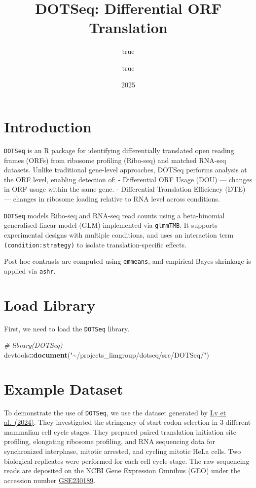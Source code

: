 \documentclass[
]{article}
\title{DOTSeq: Differential ORF Translation}
\author{true \and true}
\date{2025}
\newenvironment{Shaded}{\begin{snugshade}}{\end{snugshade}}
\newcommand{\CommentTok}[1]{\textcolor[rgb]{0.56,0.35,0.01}{\textit{#1}}}
\newcommand{\FunctionTok}[1]{\textcolor[rgb]{0.13,0.29,0.53}{\textbf{#1}}}
\newcommand{\NormalTok}[1]{#1}
\newcommand{\SpecialCharTok}[1]{\textcolor[rgb]{0.81,0.36,0.00}{\textbf{#1}}}
\newcommand{\StringTok}[1]{\textcolor[rgb]{0.31,0.60,0.02}{#1}}
\begin{document}
\maketitle

\section{Introduction}\label{introduction}

\texttt{DOTSeq} is an R package for identifying differentially
translated open reading frames (ORFs) from ribosome profiling (Ribo-seq)
and matched RNA-seq datasets. Unlike traditional gene-level approaches,
DOTSeq performs analysis at the ORF level, enabling detection of: -
Differential ORF Usage (DOU) --- changes in ORF usage within the same
gene. - Differential Translation Efficiency (DTE) --- changes in
ribosome loading relative to RNA level across conditions.

\texttt{DOTSeq} models Ribo-seq and RNA-seq read counts using a
beta-binomial generalised linear model (GLM) implemented via
\texttt{glmmTMB}. It supports experimental designs with multiple
conditions, and uses an interaction term \texttt{(condition:strategy)}
to isolate translation-specific effects.

Post hoc contrasts are computed using \texttt{emmeans}, and empirical
Bayes shrinkage is applied via \texttt{ashr}.

\section{Load Library}\label{load-library}

First, we need to load the \texttt{DOTSeq} library.

\begin{Shaded}
\begin{Highlighting}[]
\CommentTok{\# library(DOTSeq)}
\NormalTok{devtools}\SpecialCharTok{::}\FunctionTok{document}\NormalTok{(}\StringTok{"\textasciitilde{}/projects\_limgroup/dotseq/src/DOTSeq/"}\NormalTok{)}
\end{Highlighting}
\end{Shaded}

\section{Example Dataset}\label{example-dataset}

To demonstrate the use of \texttt{DOTSeq}, we use the dataset generated
by \href{https://doi.org/10.1038/s41586-024-08088-3}{Ly et al.~(2024)}.
They investigated the stringency of start codon selection in 3 different
mammalian cell cycle stages. They prepared paired translation initiation
site profiling, elongating ribosome profiling, and RNA sequencing data
for synchronized interphase, mitotic arrested, and cycling mitotic HeLa
cells. Two biological replicates were performed for each cell cycle
stage. The raw sequencing reads are deposited on the NCBI Gene
Expression Omnibus (GEO) under the accession number
\href{http://www.ncbi.nlm.nih.gov/projects/geo/query/acc.cgi?acc=GSE230189}{GSE230189}.
\end{document}
